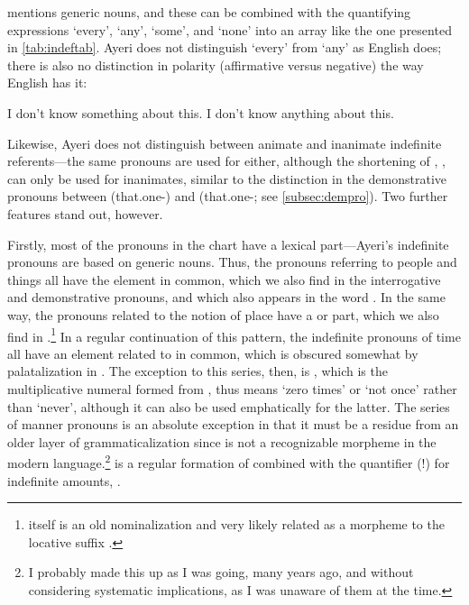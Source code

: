 \citet{haspelmath1997} mentions generic nouns, and these can be combined
with the quantifying expressions `every', `any', `some', and `none' into an
array like the one presented in \autoref{tab:indeftab}. Ayeri does not
distinguish `every' from `any' as English does; there is also no distinction in
polarity (affirmative versus negative) the way English has it:

\pex
	\a\ljudge* I don't know something about this.
	\a I don't know anything about this.
\xe

Likewise, Ayeri does not distinguish between animate and inanimate indefinite 
referents---the same pronouns are used for either, although the shortening of 
, , can only be used for 
inanimates, similar to the distinction in the demonstrative pronouns between 
 (that.one-\Aarg{}) and 
 (that.one-\AargI{}; see 
\autoref{subsec:dempro}). Two further features stand out, however.

\label{indefprocomp}
Firstly, most of the pronouns in the chart have a lexical part---Ayeri's
indefinite pronouns are based on generic nouns. Thus, the pronouns referring to
people and things all have the  element in common, which we
also find in the interrogative and demonstrative pronouns, and which also
appears in the word . In the same way, the pronouns
related to the notion of place have a  or  part,
which we also find in .\footnote{ itself
is an old nominalization and very likely related as a morpheme to the locative
suffix .} In a regular continuation of this pattern, the
indefinite pronouns of time all have an element related to
 in common, which is obscured somewhat by palatalization
in . The exception to this series, then, is
, which is the multiplicative numeral formed from
, thus means `zero times' or `not once' rather than 
`never', although it can also be used emphatically for the latter. The series
of manner pronouns is an absolute exception in that it must be a residue from
an older layer of grammaticalization since  is not a
recognizable morpheme in the modern language.\footnote{I probably made this up
as I was going, many years ago, and without considering systematic
implications, as I was unaware of them at the time.} 
is a regular formation of  combined with the
quantifier (!) for indefinite amounts, .

